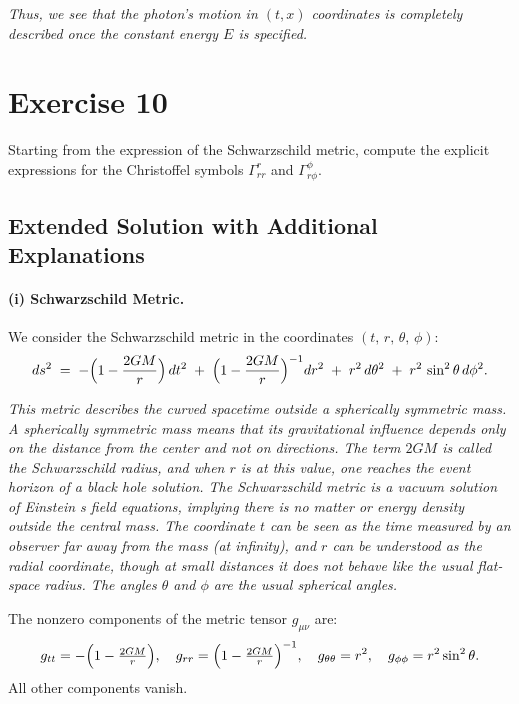 \textit{Thus, we see that the photon's motion in \((t,x)\) coordinates is completely described once the constant energy \(E\) is specified.}

\pagebreak

\section*{Exercise 10}

\noindent
Starting from the expression of the Schwarzschild metric, compute the explicit expressions for the Christoffel symbols \(\Gamma_{r r}^{r}\) and \(\Gamma_{r \phi}^{\phi}\).

\bigskip
\subsection*{Extended Solution with Additional Explanations}

\paragraph{(i) Schwarzschild Metric.}
We consider the Schwarzschild metric in the coordinates \((t,\,r,\,\theta,\,\phi)\):
\[
ds^2 \;=\; 
-\Bigl(1 - \frac{2GM}{r}\Bigr)\,dt^2
\;+\;
\Bigl(1 - \frac{2GM}{r}\Bigr)^{-1} dr^2
\;+\;
r^2 \, d\theta^2
\;+\;
r^2 \, \sin^2\theta \, d\phi^2.
\]

\emph{This metric describes the curved spacetime outside a spherically symmetric mass. A spherically symmetric mass means that its gravitational influence depends only on the distance from the center and not on directions. The term \(2GM\) is called the Schwarzschild radius, and when \(r\) is at this value, one reaches the event horizon of a black hole solution. The Schwarzschild metric is a vacuum solution of Einstein s field equations, implying there is no matter or energy density outside the central mass. The coordinate \(t\) can be seen as the time measured by an observer far away from the mass (at infinity), and \(r\) can be understood as the radial coordinate, though at small distances it does not behave like the usual flat-space radius. The angles \(\theta\) and \(\phi\) are the usual spherical angles.}

\noindent
The nonzero components of the metric tensor \(g_{\mu\nu}\) are:
\[
g_{tt} = -\Bigl(1 - \tfrac{2GM}{r}\Bigr), 
\quad
g_{rr} = \Bigl(1 - \tfrac{2GM}{r}\Bigr)^{-1},
\quad
g_{\theta\theta} = r^2,
\quad
g_{\phi\phi} = r^2 \sin^2\theta.
\]
All other components vanish.

